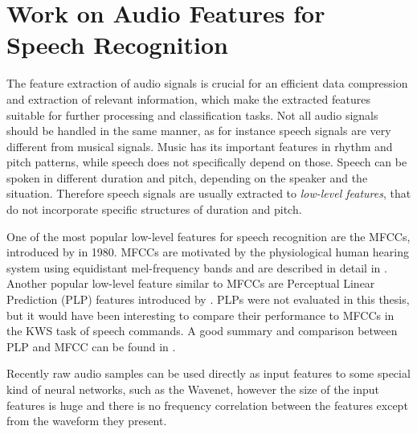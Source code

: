 
\section{Work on Audio Features for Speech Recognition}\label{sec:prev_features}
The feature extraction of audio signals is crucial for an efficient data compression and extraction of relevant information, which make the extracted features suitable for further processing and classification tasks.
Not all audio signals should be handled in the same manner, as for instance speech signals are very different from musical signals.
Music has its important features in rhythm and pitch patterns, while speech does not specifically depend on those.
Speech can be spoken in different duration and pitch, depending on the speaker and the situation.
Therefore speech signals are usually extracted to \emph{low-level features}, that do not incorporate specific structures of duration and pitch.

One of the most popular low-level features for speech recognition are the MFCCs, introduced by \cite{Mermelstein1980} in 1980.
MFCCs are motivated by the physiological human hearing system using equidistant mel-frequency bands and are described in detail in .
Another popular low-level feature similar to MFCCs are Perceptual Linear Prediction (PLP) features introduced by \cite{Hermansky1987}.
PLPs were not evaluated in this thesis, but it would have been interesting to compare their performance to MFCCs in the KWS task of speech commands.
A good summary and comparison between PLP and MFCC can be found in \cite{Hoenig2005}.

Recently raw audio samples can be used directly as input features to some special kind of neural networks, such as the Wavenet, however the size of the input features is huge and there is no frequency correlation between the features except from the waveform they present.